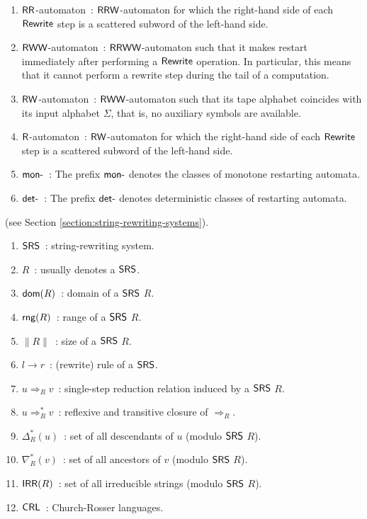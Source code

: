 \begin{enumerate}[]
\item $\textup{\sf RR}$-automaton\ : $\textup{\sf RRW}$-automaton for which the right-hand side of each $\textup{\sf Rewrite}$ step is a scattered subword of the left-hand side.
\item $\textup{\sf RWW}$-automaton\ : $\textup{\sf RRWW}$-automaton such that it makes restart immediately after performing a $\textup{\sf Rewrite}$ operation. In particular, this means that it cannot perform a rewrite step during the tail of a computation.
\item $\textup{\sf RW}$-automaton\ : $\textup{\sf RWW}$-automaton such that its tape alphabet coincides with its input alphabet $\Sigma$, that is, no auxiliary symbols are available.
\item $\textup{\sf R}$-automaton\ : $\textup{\sf RW}$-automaton for which the right-hand side of each $\textup{\sf Rewrite}$ step is a scattered subword of the left-hand side.
\item $\textup{\sf mon-}$\ : The prefix $\textup{\sf mon-}$ denotes the classes of monotone restarting automata.
\item $\textup{\sf det-}$\ : The prefix $\textup{\sf det-}$ denotes deterministic classes of restarting automata.
\end{enumerate}

 (see Section \ref{section:string-rewriting-systems}).

\begin{enumerate}[]
\item $\textup{\sf SRS}$\ : string-rewriting system.
\item $R$\ : usually denotes a $\textup{\sf SRS}$.
\item $\textup{\sf dom}(R)$\ : domain of a $\textup{\sf SRS}$ $R$.
\item $\textup{\sf rng}(R)$\ : range of a $\textup{\sf SRS}$ $R$.
\item $\|R\|$\ : size of a $\textup{\sf SRS}$ $R$.
\item $l \to r$\ : (rewrite) rule of a $\textup{\sf SRS}$.
\item $u \Rightarrow_R v$\ : single-step reduction relation induced by a $\textup{\sf SRS}$ $R$.
\item $u \Rightarrow_R^* v$\ : reflexive and transitive closure of $\Rightarrow_R$.
\item $\Delta_R^*(u)$\ : set of all descendants of $u$ (modulo $\textup{\sf SRS}$ $R$).
\item $\nabla_R^*(v)$\ : set of all ancestors of $v$ (modulo $\textup{\sf SRS}$ $R$).
\item $\textup{\sf IRR}(R)$\ : set of all irreducible strings (modulo $\textup{\sf SRS}$ $R$).
\item $\textup{\sf CRL}$\ : Church-Rosser languages.
\end{enumerate}

